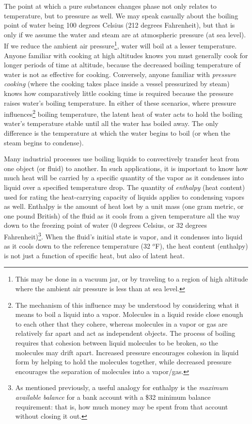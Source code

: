 The point at which a pure substances changes phase not only relates to temperature, but to pressure as well.  We may speak casually about the boiling point of water being 100 degrees Celsius (212 degrees Fahrenheit), but that is only if we assume the water and steam are at atmospheric pressure (at sea level).  If we reduce the ambient air pressure\footnote{This may be done in a vacuum jar, or by traveling to a region of high altitude where the ambient air pressure is less than at sea level.}, water will boil at a lesser temperature.  Anyone familiar with cooking at high altitudes knows you must generally cook for longer periods of time at altitude, because the decreased boiling temperature of water is not as effective for cooking.  Conversely, anyone familiar with \textit{pressure cooking} (where the cooking takes place inside a vessel pressurized by steam) knows how comparatively little cooking time is required because the pressure raises water's boiling temperature.  In either of these scenarios, where pressure influences\footnote{The mechanism of this influence may be understood by considering what it means to boil a liquid into a vapor.  Molecules in a liquid reside close enough to each other that they cohere, whereas molecules in a vapor or gas are relatively far apart and act as independent objects.  The process of boiling requires that cohesion between liquid molecules to be broken, so the molecules may drift apart.  Increased pressure encourages cohesion in liquid form by helping to hold the molecules together, while decreased pressure encourages the separation of molecules into a vapor/gas.} boiling temperature, the latent heat of water acts to hold the boiling water's temperature stable until all the water has boiled away.  The only difference is the temperature at which the water begins to boil (or when the steam begins to condense).

\vskip 10pt

Many industrial processes use boiling liquids to convectively transfer heat from one object (or fluid) to another.  In such applications, it is important to know how much heat will be carried by a specific quantity of the vapor as it condenses into liquid over a specified temperature drop.  The quantity of \textit{enthalpy} (heat content) used for rating the heat-carrying capacity of liquids applies to condensing vapors as well.  Enthalpy is the amount of heat lost by a unit mass (one gram metric, or one pound British) of the fluid as it cools from a given temperature all the way down to the freezing point of water (0 degrees Celsius, or 32 degrees Fahrenheit)\footnote{As mentioned previously, a useful analogy for enthalpy is the \textit{maximum available balance} for a bank account with a \$32 minimum balance requirement: that is, how much money may be spent from that account without closing it out.}.  When the fluid's initial state is vapor, and it condenses into liquid as it cools down to the reference temperature (32 $^{o}$F), the heat content (enthalpy) is not just a function of specific heat, but also of latent heat.    

